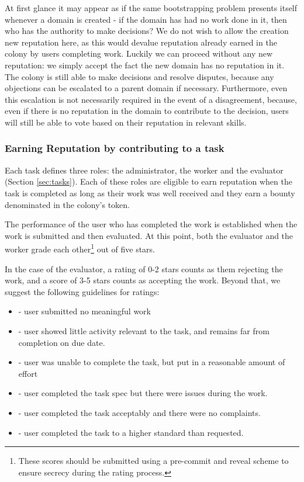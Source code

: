 At first glance it may appear as if the same bootstrapping problem presents itself whenever a domain is created - if the domain has had no work done in it, then who has the authority to make decisions? We do not wish to allow the creation new reputation here, as this would devalue reputation already earned in the colony by users completing work. Luckily we can proceed without any new reputation: we simply accept the fact the new domain has no reputation in it. The colony is still able to make decisions and resolve disputes, because any objections can be escalated to a parent domain if necessary. Furthermore, even this escalation is not necessarily required in the event of a disagreement, because, even if there is no reputation in the domain to contribute to the decision, users will still be able to vote based on their reputation in relevant skills.

\subsubsection{Earning Reputation by contributing to a task}\label{sec:earning-rep-from-task}
Each task defines three roles: the administrator, the worker and the evaluator (Section \ref{sec:tasks}). Each of these roles are eligible to earn reputation when the task is completed as long as their work was well received and they earn a bounty denominated in the colony's token. 

The performance of the user who has completed the work is established when the work is submitted and then evaluated. At this point, both the evaluator and the worker grade each other\footnote{These scores should be submitted using a pre-commit and reveal scheme to ensure secrecy during the rating process.} out of five stars.

In the case of the evaluator, a rating of 0-2 stars counts as them rejecting the work, and a score of 3-5 stars counts as accepting the work. Beyond that, we suggest the following guidelines for ratings:
\begin{itemize}
 \item[0 stars] - user submitted no meaningful work 
 \item[1 star] - user showed little activity relevant to the task, and remains far from completion on due date.
 \item[2 stars] - user was unable to complete the task, but put in a reasonable amount of effort
 \item[3 stars] - user completed the task spec but there were issues during the work.
 \item[4 stars] - user completed the task acceptably and there were no complaints.
 \item[5 stars] - user completed the task to a higher standard than requested.
\end{itemize}

